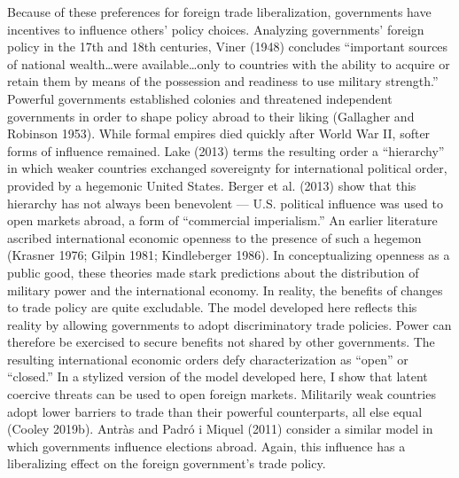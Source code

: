 \documentclass{puthesis}
\begin{document}
Because of these preferences for foreign trade liberalization,
governments have incentives to influence others' policy choices.
Analyzing governments' foreign policy in the 17th and 18th centuries,
Viner (1948) concludes ``important sources of national wealth\ldots were
available\ldots only to countries with the ability to acquire or retain
them by means of the possession and readiness to use military
strength.'' Powerful governments established colonies and threatened
independent governments in order to shape policy abroad to their liking
(Gallagher and Robinson 1953). While formal empires died quickly after
World War II, softer forms of influence remained. Lake (2013) terms the
resulting order a ``hierarchy'' in which weaker countries exchanged
sovereignty for international political order, provided by a hegemonic
United States. Berger et al. (2013) show that this hierarchy has not
always been benevolent --- U.S. political influence was used to open
markets abroad, a form of ``commercial imperialism.'' An earlier
literature ascribed international economic openness to the presence of
such a hegemon (Krasner 1976; Gilpin 1981; Kindleberger 1986). In
conceptualizing openness as a public good, these theories made stark
predictions about the distribution of military power and the
international economy. In reality, the benefits of changes to trade
policy are quite excludable. The model developed here reflects this
reality by allowing governments to adopt discriminatory trade policies.
Power can therefore be exercised to secure benefits not shared by other
governments. The resulting international economic orders defy
characterization as ``open'' or ``closed.'' In a stylized version of the
model developed here, I show that latent coercive threats can be used to
open foreign markets. Militarily weak countries adopt lower barriers to
trade than their powerful counterparts, all else equal (Cooley 2019b).
Antràs and Padró i Miquel (2011) consider a similar model in which
governments influence elections abroad. Again, this influence has a
liberalizing effect on the foreign government's trade policy.
\end{document}
